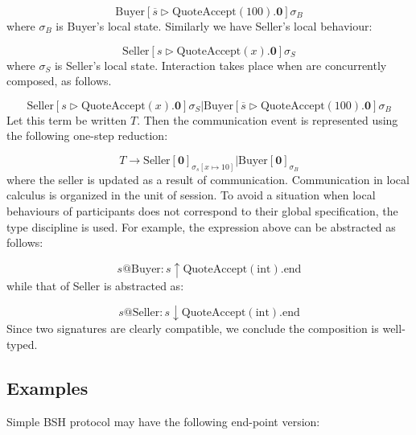 \begin{equation*}
\text{Buyer}[\overline{s} \triangleright \text{QuoteAccept}(100).\textbf{0}]\sigma_B
\end{equation*}
where $\sigma_B$ is Buyer's local state. Similarly we have Seller's local behaviour:

\begin{equation*}
\text{Seller}[s \triangleright \text{QuoteAccept}(x).\textbf{0}]\sigma_S
\end{equation*}
where $\sigma_S$ is Seller's local state. Interaction takes place when are concurrently composed, as follows.

\begin{equation*}
\text{Seller}[s \triangleright \text{QuoteAccept}(x).\textbf{0}]\sigma_S | \text{Buyer}[\overline{s} \triangleright \text{QuoteAccept}(100).\textbf{0}]\sigma_B
\end{equation*}
Let this term be written $T$. Then the communication event is represented using the following one-step reduction:

\begin{equation*}
T \rightarrow \text{Seller}[\textbf{0}]_{\sigma_s[x \mapsto 10]}|\text{Buyer}[\textbf{0}]_{\sigma_B}
\end{equation*}
where the seller is updated as a result of communication. Communication in local calculus is organized in the unit of session. To avoid a situation when local behaviours of participants does not correspond to their global specification, the type discipline is used. For example, the expression above can be abstracted as follows:

\begin{equation*}
s@\text{Buyer}:s\uparrow\text{QuoteAccept}(\text{int}).\text{end}
\end{equation*}
while that of Seller is abstracted as:

\begin{equation*}
s@\text{Seller}:s\downarrow\text{QuoteAccept}(\text{int}).\text{end}
\end{equation*}
Since two signatures are clearly compatible, we conclude the composition is well-typed.

\subsection{Examples}

Simple BSH protocol may have the following end-point version:

